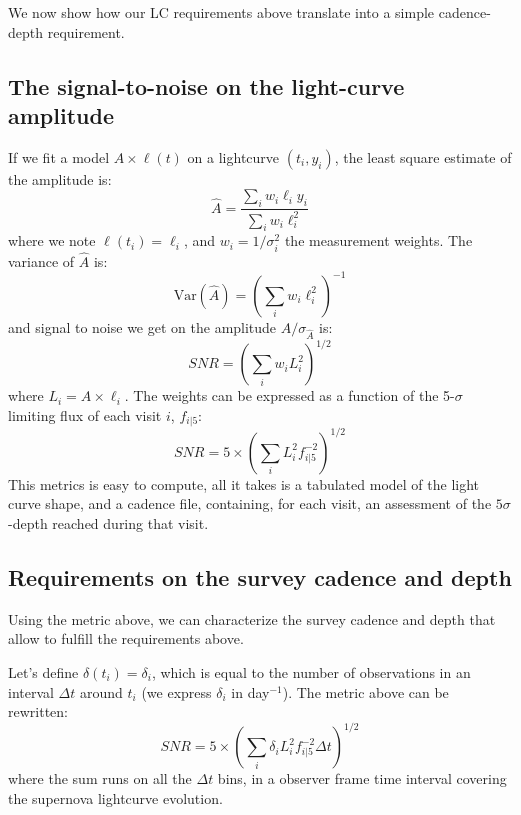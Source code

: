 \documentclass[\docopts]{\docclass}
\begin{document}
We now show how our LC requirements above translate into a simple
cadence-depth requirement.


\subsection{The signal-to-noise on the light-curve amplitude}

If we fit a model $A \times \ell(t)$ on a lightcurve $(t_i, y_i)$, the
least square estimate of the amplitude is:
\begin{equation}
  \hat{A} = \frac{\sum_i w_i \ell_i y_i}{\sum_i w_i \ell^2_i}
\end{equation}
where we note $\ell(t_i) = \ell_i$, and $w_i = 1 / \sigma_i^2$ the
measurement weights. The variance of $\hat{A}$ is:
\begin{equation}
  \mathrm{Var}(\hat{A}) = \left(\sum_i w_i \ell^2_i\right)^{-1}
\end{equation}
and signal to noise we get on the amplitude $\hat{A} /
\sigma_{\hat{A}}$ is:
\begin{equation}
  SNR = \left(\sum_i w_i L^2_i\right)^{1/2}
\end{equation}
where $L_i = A \times \ell_i$.  The weights can be expressed as a
function of the 5-$\sigma$ limiting flux of each visit $i$, $f_{i|5}$:
\begin{equation}
  SNR = 5 \times \left(\sum_i L^2_i f^{-2}_{i|5}\right)^{1/2}
  \label{eqn:snr}
\end{equation}
This metrics is easy to compute, all it takes is a tabulated model of
the light curve shape, and a cadence file, containing, for each visit,
an assessment of the $5\sigma$-depth reached during that visit. 


\subsection{Requirements on the survey cadence and depth}

Using the metric above, we can characterize the survey cadence and
depth that allow to fulfill the requirements above.

Let's define $\delta(t_i) = \delta_i$, which is equal to the number of
observations in an interval $\Delta t$ around $t_i$ (we express
$\delta_i$ in day$^{-1}$). The metric above can be rewritten:
\begin{equation}
  SNR = 5 \times \left(\sum_i \delta_i L^2_i f^{-2}_{i|5} \Delta t\right)^{1/2}
\end{equation}
where the sum runs on all the $\Delta t$ bins, in a observer frame
time interval covering the supernova lightcurve evolution. 
\end{document}
